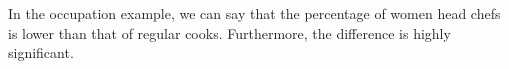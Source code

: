 \documentclass[11pt, chapterprefix=true]{scrbook}\usepackage[]{graphicx}\usepackage[]{color}
\begin{document}
\begin{center}
\end{center}

In the occupation example, we can say that the percentage of women head chefs
is lower than that of regular cooks.  Furthermore, the difference is highly significant.

%
%
%
%
%
%
%
%
\end{document}
